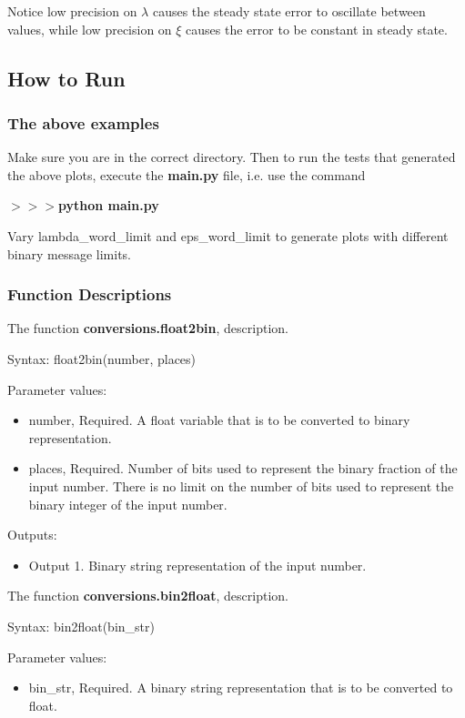 \documentclass[12pt]{article}
\begin{document}
Notice low precision on $\lambda$ causes the steady state error to oscillate between values, while low precision on $\xi$ causes the error to be constant in steady state.

\subsection*{How to Run}

\subsubsection*{The above examples}

Make sure you are in the correct directory. Then to run the tests that generated the above plots, execute the \textbf{main.py} file, i.e. use the command

\noindent \textbf{$>>>$python main.py}

Vary lambda\_word\_limit and eps\_word\_limit to generate plots with different binary message limits.

\subsubsection*{Function Descriptions}

The function \textbf{conversions.float2bin}, description.

Syntax: float2bin(number, places)

Parameter values:
\begin{itemize}
	\item number, Required. A float variable that is to be converted to binary representation.
	\item places, Required. Number of bits used to represent the binary fraction of the input number. There is no limit on the number of bits used to represent the binary integer of the input number.
\end{itemize}

Outputs:
\begin{itemize}
	\item Output 1. Binary string representation of the input number. 
\end{itemize}

\noindent The function \textbf{conversions.bin2float}, description.

Syntax: bin2float(bin\_str)

Parameter values:
\begin{itemize}
	\item bin\_str, Required. A binary string representation that is to be converted to float.
\end{itemize}
\end{document}
